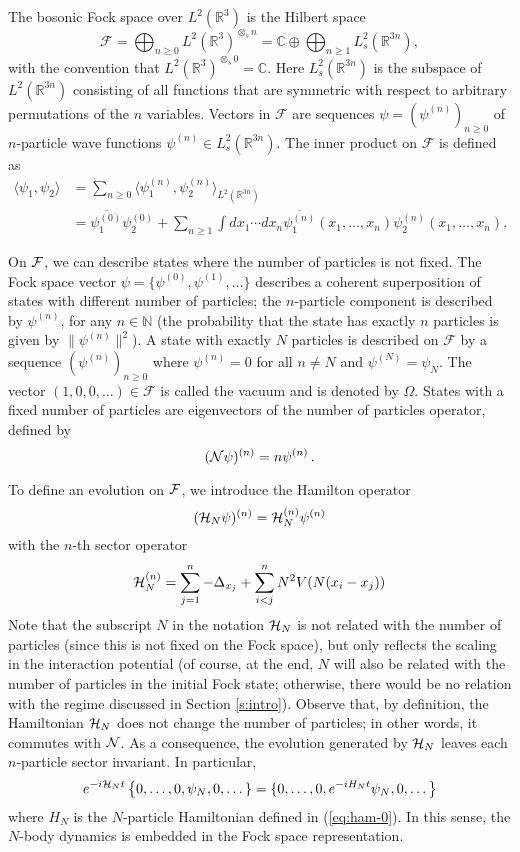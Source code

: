 \documentclass[11pt,a4paper,DIV11]{scrartcl}	%
\newcommand{\bN}{{\mathbb N}}
\newcommand{\cF}{{\cal F}}
\newcommand{\cH}{{\cal H}}
\newcommand{\cN}{{\cal N}}
\newcommand{\R}{\mathds{R}}
\begin{document}
The bosonic Fock space over $L^2(\R^3)$ is the Hilbert space
\[
  \mathcal{F} = \bigoplus_{n \ge 0} L^2(\R^3)^{\otimes_s n} = \mathds{C}
  \oplus \bigoplus_{n \ge 1} L^2_s(\R^{3n}),
\]
with the convention that $L^2(\R^3)^{\otimes_s 0} = \mathds{C}$. Here
$L^2_s (\R^{3n})$ is the subspace of $L^2(\R^{3n})$ consisting of all functions
that are symmetric with respect to arbitrary permutations of the $n$
variables. Vectors in $\mathcal{F}$ are sequences $\psi = (\psi^{(n)})_{n
\ge 0}$ of $n$-particle wave functions $\psi^{(n)} \in L^2_s(\R^{3n})$. The
inner product on $\mathcal{F}$ is defined as
\begin{align*}
  \langle \psi_1, \psi_2 \rangle & = \sum_{n \ge 0} \langle \psi_1^{(n)},
  \psi_2^{(n)} \rangle_{L^2(\R^{3n})} \\
  & = \overline{\psi_1^{(0)}} \psi_2^{(0)} + \sum_{n \ge 1} \int dx_1 \cdots
  dx_n \overline{\psi_1^{(n)}}(x_1, \dots, x_n) \psi_2^{(n)}(x_1, \dots, x_n).
\end{align*}

On $\cF$, we can describe states where the number of particles is not fixed. The Fock space 
vector $\psi = \{ \psi^{(0)}, \psi^{(1)}, \dots  \}$ describes a coherent superposition 
of states with different number of particles; the $n$-particle component is described by $\psi^{(n)}$, for any $n \in \bN$ (the probability that the state has exactly $n$ particles is given by $\| \psi^{(n)} \|^2$).  
A state with exactly $N$ particles is described on
$\mathcal{F}$ by a sequence $(\psi^{(n)})_{n \ge 0}$ where $\psi^{(n)} =
0$ for all $n \neq N$ and $\psi^{(N)} = \psi_N$. The vector $(1, 0, 0, \dots
) \in \mathcal{F}$ is called the vacuum and is denoted by $\Omega$.
States with a fixed number of particles are eigenvectors of the number of particles operator, defined by
\[ (\cN \psi)^{(n)} = n \psi^{(n)} \, . \]

To define an evolution on $\cF$, we introduce the Hamilton operator 
\[ (\cH_N \psi)^{(n)} = \cH_N^{(n)} \psi^{(n)} \]
with the $n$-th sector operator 
\[ \cH_N^{(n)} = \sum_{j=1}^n -\Delta_{x_j} + \sum_{i<j}^n N^2 V(N (x_i - x_j)) \]
Note that the subscript $N$ in the notation $\cH_N$ is not related with the number of particles (since this is not fixed on the Fock space), but only reflects the scaling in the interaction potential (of course, at the end, $N$ will also be related with the number of particles in the initial Fock state; otherwise, there would be no relation with the regime discussed in Section \ref{s:intro}). Observe that, by definition, the Hamiltonian $\cH_N$ does not change the number of particles; in other words, it commutes with $\cN$. As a consequence, the evolution generated by $\cH_N$ leaves each $n$-particle sector invariant. In particular, 
\[ e^{-i\cH_N t}  \left\{ 0, \dots , 0, \psi_N , 0 ,\dots \} = \{ 0, \dots, 0, e^{-iH_N t} \psi_N , 0 ,\dots \right\} \]
where $H_N$ is the $N$-particle Hamiltonian defined in (\ref{eq:ham-0}). In this sense, the $N$-body dynamics is embedded in the Fock space representation. 
\end{document}

